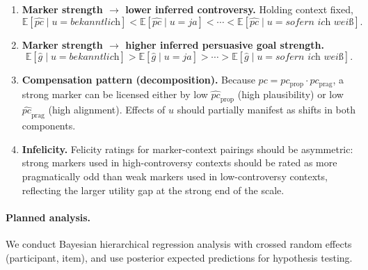 \documentclass[12pt]{article}
\begin{document}
\begin{enumerate}
\item \textbf{Marker strength $\rightarrow$ lower inferred controversy.}
Holding context fixed,
\[
\mathbb{E}[\widehat{pc}\mid u=\textit{bekanntlich}]
<
\mathbb{E}[\widehat{pc}\mid u=\textit{ja}]
<
\cdots
<
\mathbb{E}[\widehat{pc}\mid u=\textit{sofern ich weiß}].
\]
\item \textbf{Marker strength $\rightarrow$ higher inferred persuasive goal strength.}
\[
\mathbb{E}[\widehat{g}\mid u=\textit{bekanntlich}]
>
\mathbb{E}[\widehat{g}\mid u=\textit{ja}]
>
\cdots
>
\mathbb{E}[\widehat{g}\mid u=\textit{sofern ich weiß}].
\]
\item \textbf{Compensation pattern (decomposition).}
Because $pc=pc_{\text{prop}}\cdot pc_{\text{prag}}$, a strong marker can be licensed either by low $\widehat{pc}_{\text{prop}}$ (high plausibility) or low $\widehat{pc}_{\text{prag}}$ (high alignment).
Effects of $u$ should partially manifest as shifts in both components.

\item \textbf{Infelicity.}
Felicity ratings for marker-context pairings should be asymmetric: strong markers used in high-controversy contexts should be rated as more pragmatically odd than weak markers used in low-controversy contexts, reflecting the larger utility gap at the strong end of the scale.
\end{enumerate}

\paragraph{Planned analysis.}
We conduct Bayesian hierarchical regression analysis with crossed random effects (participant, item), and use posterior expected predictions for hypothesis testing.
\end{document}
